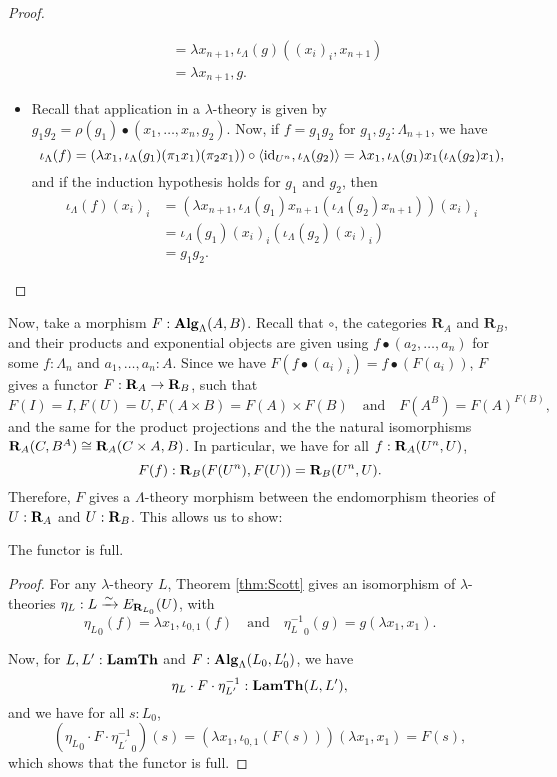 \begin{proof}
\begin{itemize}
\begin{align*}
        &= \lambda x_{n + 1}, \iota_\Lambda(g) ((x_i)_i, x_{n + 1})\\
        &= \lambda x_{n + 1}, g.
      \end{align*}
    \item Recall that application in a $ \lambda $-theory is given by $ g_1 g_2 = \rho(g_1) \bullet (x_1, \dots, x_n, g_2) $. Now, if $ f = g_1 g_2 $ for $ g_1, g_2 : \Lambda_{n + 1} $, we have
      \[
        \iota_\Lambda(f)
        = (\lambda x_1, \iota_\Lambda(g_1) (\pi_1 x_1) (\pi_2 x_1)) \circ \langle \text{id}_{U^n}, \iota_\Lambda(g_2) \rangle
        = \lambda x_1, \iota_\Lambda(g_1) x_1 (\iota_\Lambda(g_2) x_1),
      \]
      and if the induction hypothesis holds for $ g_1 $ and $ g_2 $, then
      \begin{align*}
        \iota_\Lambda(f) (x_i)_i
        &= (\lambda x_{n + 1}, \iota_\Lambda(g_1) x_{n + 1} (\iota_\Lambda(g_2) x_{n + 1})) (x_i)_i\\
        &= \iota_\Lambda(g_1) (x_i)_i (\iota_\Lambda(g_2) (x_i)_i)\\
        &= g_1 g_2.
      \end{align*}
  \end{itemize}
\end{proof}

Now, take a morphism $ F: \mathbf{Alg}_{\Lambda}(A, B) $. Recall that $ \circ $, the categories $ \mathbf R_A $ and $ \mathbf R_B $, and their products and exponential objects are given using $ f \bullet (a_2, \dots, a_n) $ for some $ f: \Lambda_n $ and $ a_1, \dots, a_n : A $. Since we have $ F(f \bullet (a_i)_i) = f \bullet (F(a_i)) $, $ F $ gives a functor $ F: \mathbf{R}_A \to \mathbf{R}_B $, such that
\[ F(I) = I, F(U) = U, F(A \times B) = F(A) \times F(B) \quad \text{and} \quad F(A^B) = F(A)^{F(B)}, \]
and the same for the product projections and the the natural isomorphisms $ \mathbf{R}_A(C, B^A) \cong \mathbf{R}_A(C \times A, B) $. In particular, we have for all $ f: \mathbf{R}_A(U^n, U) $,
\[ F(f) : \mathbf{R}_B(F(U^n), F(U)) = \mathbf{R}_B(U^n, U). \]
Therefore, $ F $ gives a $ \Lambda $-theory morphism between the endomorphism theories of $ U: \mathbf{R}_A $ and $ U: \mathbf{R}_B $. This allows us to show:
\begin{lemma}\label{lem:elementary-full}
  The functor is full.
\end{lemma}
\begin{proof}
  For any $ \lambda $-theory $ L $, Theorem \ref{thm:Scott} gives an isomorphism of $ \lambda $-theories $ \eta_L: L \xrightarrow \sim E_{\mathbf{R}_{L_0}}(U) $, with
  \[ {\eta_L}_0(f) = \lambda x_1, \iota_{0, 1}(f) \quad \text{and} \quad {\eta_L^{-1}}_0(g) = g(\lambda x_1, x_1). \]

  Now, for $ L, L^\prime: \mathbf{LamTh} $ and $ F: \mathbf{Alg}_{\Lambda}(L_0, L^\prime_0) $, we have
  \[ \eta_L \cdot F \cdot \eta_{L^\prime}^{-1} : \mathbf{LamTh}(L, L^\prime), \]
  and we have for all $ s : L_0 $,
  \[ ({\eta_L}_0 \cdot F \cdot {\eta_{L^\prime}^{-1}}_0)(s) = (\lambda x_1, \iota_{0, 1}(F(s))) (\lambda x_1, x_1) = F(s), \]
  which shows that the functor is full.
\end{proof}

